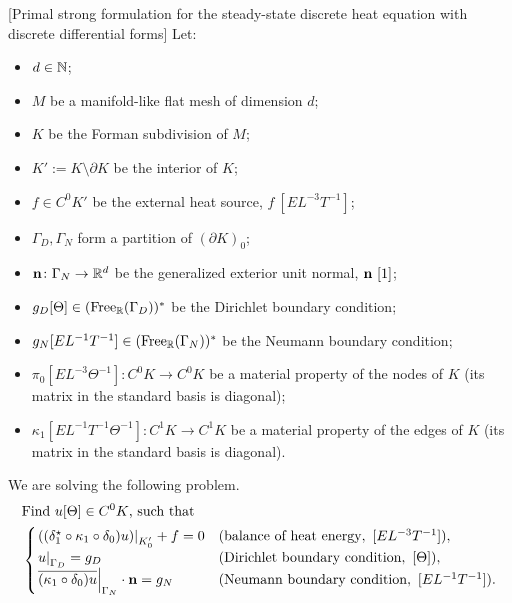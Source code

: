 \begin{formulation}
  \label{cmc/diffusion/discrete/steady_state/primal_strong_with_normals-discussion}
  [Primal strong formulation for the steady-state discrete heat equation
    with discrete differential forms]
  Let:
  \begin{itemize}
    \item
      $d \in \mathbb{N}$;
    \item
      $M$ be a manifold-like flat mesh of dimension $d$;
    \item
      $K$ be the Forman subdivision of $M$;
    \item
      $K' := K \setminus \partial K$ be the interior of $K$;
    \item
      $f \in C^0 K'$ be the external heat source, $f\ [E L^{-3} T^{-1}]$;
    \item
      $\Gamma_D, \Gamma_N$ form a partition of $(\partial K)_0$;
    \item
      ${\bf n} \colon \Gamma_N \to \mathbb{R}^d$
      be the generalized exterior unit normal, ${\bf n}\ [1]$;
    \item
      $g_D [\Theta]\in ({\rm Free}_{\mathbb{R}}(\Gamma_D))^*$
      be the Dirichlet boundary condition;
    \item
      $g_N [E L^{-1} T^{-1}] \in ({\rm Free}_{\mathbb{R}}(\Gamma_N))^*$
      be the Neumann boundary condition;
    \item
      $\pi_0 [E L^{-3} \Theta^{-1}] \colon C^0 K \to C^0 K$ be a material
      property of the nodes of $K$
      (its matrix in the standard basis is diagonal);
    \item
      $\kappa_1 [E L^{-1} T^{-1} \Theta^{-1}] \colon C^1 K \to C^1 K$ be a
      material property of the edges of $K$
      (its matrix in the standard basis is diagonal).
  \end{itemize}
  We are solving the following problem.
  \begin{equation}
    \begin{split}
      & \text{Find $u [\Theta] \in C^0 K$, such that} \\
      &
      \begin{cases}
        \left. ((\delta_1^\star \circ \kappa_1 \circ \delta_0) u) \right|_{K'_0} + f
        = 0
        & (\text{balance of heat energy},\ [E L^{-3} T^{-1}]), \\
        \left. u \right|_{\Gamma_D} = g_D
        & (\text{Dirichlet boundary condition},\ [\Theta]), \\
        \left. \overline{(\kappa_1 \circ \delta_0) u} \right|_{\Gamma_N}
        \cdot {\bf n} = g_N
        & (\text{Neumann boundary condition},\ [E L^{-1} T^{-1}]).
      \end{cases}
    \end{split}
  \end{equation}
\end{formulation}
